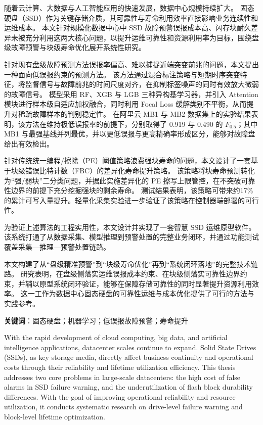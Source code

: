 \cleardoublepage
{}

随着云计算、大数据与人工智能应用的快速发展，数据中心规模持续扩大。
固态硬盘（SSD）作为关键存储介质，其可靠性与寿命利用效率直接影响业务连续性和运维成本。
本文针对规模化数据中心中 SSD 故障预警误报成本高、闪存块耐久差异未被充分利用这两大核心问题，以提升运维可靠性和资源利用率为目标，围绕盘级故障预警与块级寿命优化展开系统性研究。

针对现有盘级故障预测方法误报率偏高、难以捕捉近端突变前兆的问题，本文提出一种面向低误报约束的预测方法。
该方法通过混合标注策略与短期时序突变特征，将监督信号与故障前兆的时间尺度对齐，在抑制标签噪声的同时有效放大微弱的故障信号。
模型采用 RF、XGB 与 LGB 三种异构基学习器，并引入 Attention 模块进行样本级自适应加权融合，同时利用 Focal Loss 缓解类别不平衡，从而提升对稀疏故障样本的判别稳定性。
在阿里云 MB1 与 MB2 数据集上的实验结果表明，该方法在维持极低误报率的前提下，分别取得了 0.919 与 0.490 的 $F_{0.5}$；其中 MB1 与最强基线并列最优，并以更低误报与更高精确率形成区分，能够对故障盘给出有效检出。

针对传统统一编程/擦除（PE）阈值策略浪费强块寿命的问题，本文设计了一套基于块级错误比特计数（FBC）的差异化寿命提升策略。
该策略将块寿命预测转化为“强/弱块”二分类问题，并据此实施差异化的 PE 擦写上限管控，在不突破可靠性边界的前提下充分挖掘强块的剩余寿命。
测试结果表明，该策略可带来约17\%的累计可写入量提升。轻量化采集实验进一步验证了该策略在控制器端部署的可行性。

为验证上述算法的工程实用性，本文设计并实现了一套智慧 SSD 运维原型软件。
该系统打通了从数据采集、模型推理到预警处置的完整业务闭环，并通过功能测试覆盖采集—推理—预警处置链路。

本文构建了从“盘级精准预警”到“块级寿命优化”再到“系统闭环落地”的完整技术链路。
研究表明，在盘级侧落实运维误报成本约束、在块级侧落实可靠性边界约束，并辅以原型系统闭环验证，能够在保障存储可靠性的同时显著提升资源利用效率。
这一工作为数据中心固态硬盘的可靠性运维与成本优化提供了可行的方法与实践参考。  

\textbf{关键词}：固态硬盘；机器学习；低误报故障预警；寿命提升

\cleardoublepage
{}

With the rapid development of cloud computing, big data, and artificial intelligence applications, datacenter scales continue to expand.
Solid State Drives (SSDs), as key storage media, directly affect business continuity and operational costs through their reliability and lifetime utilization efficiency.
This thesis addresses two core problems in large-scale datacenters: the high cost of false alarms in SSD failure warning, and the underutilization of flash block durability differences.
With the goal of improving operational reliability and resource utilization, it conducts systematic research on drive-level failure warning and block-level lifetime optimization.

